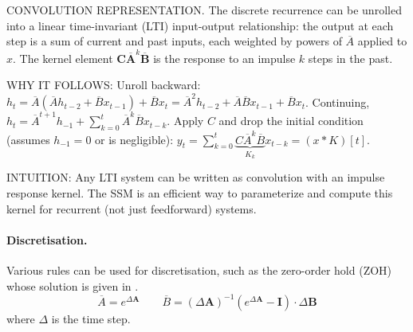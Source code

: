 \begin{ThomasAnnotation}
  CONVOLUTION REPRESENTATION. The discrete recurrence can be unrolled into a linear time-invariant (LTI) input-output relationship: the output at each step is a sum of current and past inputs, each weighted by powers of $\overline{A}$ applied to $x$. The kernel element $\bm{C}\bm{\overline{A}}^{k}\bm{\overline{B}}$ is the response to an impulse $k$ steps in the past.
  
  WHY IT FOLLOWS: Unroll  backward: $h_t = \overline{A}(\overline{A}h_{t-2} + \overline{B}x_{t-1}) + \overline{B}x_t = \overline{A}^2 h_{t-2} + \overline{A}\overline{B}x_{t-1} + \overline{B}x_t$. Continuing, $h_t = \overline{A}^{t+1}h_{-1} + \sum_{k=0}^{t} \overline{A}^{k}\overline{B}x_{t-k}$. Apply $C$ and drop the initial condition (assumes $h_{-1} = 0$ or is negligible): $y_t = \sum_{k=0}^{t} \underbrace{C\overline{A}^k\overline{B}}_{K_k} x_{t-k} = (x \ast K)[t]$.
  
  INTUITION: Any LTI system can be written as convolution with an impulse response kernel. The SSM is an efficient way to parameterize and compute this kernel for recurrent (not just feedforward) systems.
\end{ThomasAnnotation}

\paragraph{Discretisation.} Various rules can be used for discretisation, such as the zero-order hold (ZOH) whose solution is given in .
\begin{equation}
\label{eq:zoh}
\overline{A} = e^{\Delta \bm{A}}
\qquad
\overline{B} = (\Delta \bm{A})^{-1} (e^{\Delta \bm{A}} - \bm{I}) \cdot \Delta \bm{B}
\end{equation}
where $\Delta$ is the time step.

